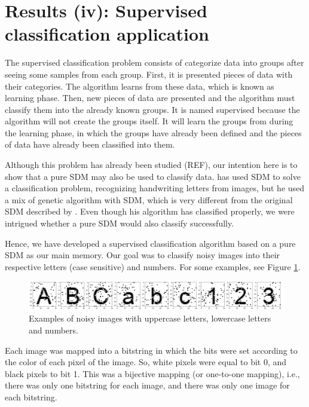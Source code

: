
\section{Results (iv): Supervised classification application}

The supervised classification problem consists of categorize data into groups after seeing some samples from each group. First, it is presented pieces of data with their categories. The algorithm learns from these data, which is known as learning phase. Then, new pieces of data are presented and the algorithm must classify them into the already known groups. It is named supervised because  the algorithm will not create the groups itself. It will learn the groups from during the learning phase, in which the groups have already been defined and the pieces of data have already been classified into them.

Although this problem has already been studied (REF), our intention here is to show that a pure SDM may also be used to classify data. \citet{fan1997genetic} has used SDM to solve a classification problem, recognizing handwriting letters from images, but he used a mix of genetic algorithm with SDM, which is very different from the original SDM described by \cite{Kanerva1988}. Even though his algorithm has classified properly, we were intrigued whether a pure SDM would also classify successfully.

Hence, we have developed a supervised classification algorithm based on a pure SDM as our main memory. Our goal was to classify noisy images into their respective letters (case sensitive) and numbers. For some examples, see Figure \ref{fig-classification-examples}.

\begin{figure}[h]
\centering\includegraphics[width=\textwidth]{./images02/classification/example.png}
\caption{Examples of noisy images with uppercase letters, lowercase letters and numbers.
\label{fig-classification-examples}}
\end{figure}

Each image was mapped into a bitstring in which the bits were set according to the color of each pixel of the image. So, white pixels were equal to bit 0, and black pixels to bit 1. This was a bijective mapping (or one-to-one mapping), i.e., there was only one bitstring for each image, and there was only one image for each bitstring.

